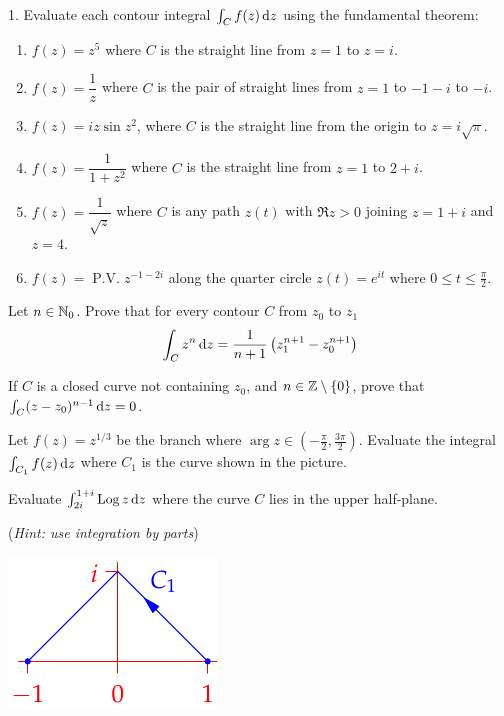 \begin{exercises*}
\hangindent\leftmargini
\textup{1. } Evaluate each contour integral $\int_Cf(z)\,{\mathrm{d} z}$ using the fundamental theorem:

\begin{enumerate}\setcounter{enumi}{1}
  \item[]\begin{enumerate}
    \item $f(z)=z^5$ where $C$ is the straight line from $z=1$ to $z=i$.
    \item $f(z)=\dfrac 1z$ where $C$ is the pair of straight lines from $z=1$ to $-1-i$ to $-i$.
    
    \item $f(z)=iz\sin z^2$, where $C$ is the straight line from the origin to $z=i\sqrt\pi$.
    
    \item $f(z)=\dfrac 1{1+z^2}$ where $C$ is the straight line from $z=1$ to $2+i$.
    \item $f(z)=\dfrac 1{\sqrt z}$ where $C$ is any path $z(t)$ with $\Re z>0$ joining $z=1+i$ and $z=4$.
    
    \item $f(z)=\operatorname{P.V.}z^{-1-2i}$ along the quarter circle $z(t)=e^{it}$ where $0\le t\le\frac\pi 2$.
	\end{enumerate}
	
  \item Let $n\in\mathbb{N}_0$. Prove that for every contour $C$ from $z_0$ to $z_1$
  \[\int_C z^n\,{\mathrm{d} z}=\frac 1{n+1}\left(z_1^{n+1}-z_0^{n+1}\right)\]

  \item If $C$ is a closed curve not containing $z_0$, and $n\in\mathbb{Z}\setminus\{0\}$, prove that $\int_C (z-z_0)^{n-1}\,{\mathrm{d} z}=0$.
  

	\begin{minipage}[t]{0.75\linewidth}\vspace{0pt}
	\item Let $f(z)=z^{1/3}$ be the branch where $\arg z\in(-\frac\pi 2,\frac{3\pi}2)$. Evaluate the integral $\int_{C_1}f(z)\,{\mathrm{d} z}$ where $C_1$ is the curve shown in the picture.
	
	\item Evaluate $\int_{2i}^{1+i}\operatorname{Log} z\,{\mathrm{d} z}$ where the curve $C$ lies in the upper half-plane.\par
	(\emph{Hint: use integration by parts})
	\end{minipage}\begin{minipage}[t]{0.25\linewidth}\vspace{-10pt}
	\flushright\includegraphics{ftc-3}
	\end{minipage}
	

\end{enumerate}
\end{exercises*}
